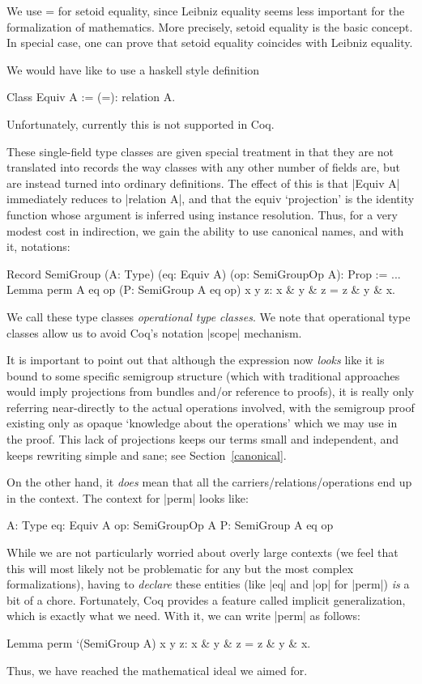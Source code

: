 \documentclass[a4paper,10pt, runningheads]{llncs}
\begin{document}
We use = for setoid equality, since Leibniz equality seems less important for the formalization of
mathematics. More precisely, setoid equality is the basic concept. In special case, one can prove
that setoid equality coincides with Leibniz equality.

We would have like to use a haskell style definition
\begin{code}
Class Equiv A := (=): relation A.
\end{code}
Unfortunately, currently this is not supported in Coq.

These single-field type classes are given special treatment in that they are not translated into
records the way classes with any other number of fields are, but are instead turned into ordinary
definitions. The effect of this is that |Equiv A| immediately reduces to |relation A|, and that the
equiv `projection' is the identity function whose argument is inferred using instance resolution.
Thus, for a very modest cost in indirection, we gain the ability to use canonical names, and with
it, notations:
\begin{code}
Record SemiGroup (A: Type) (eq: Equiv A)
                 (op: SemiGroupOp A): Prop := ...
Lemma perm A eq op (P: SemiGroup A eq op) x y z:
                 x & y & z = z & y & x.
\end{code}
We call these type classes \emph{operational type classes}. We note that operational type classes
allow us to avoid Coq's notation |scope| mechanism.

It is important to point out that although the expression now \emph{looks} like it is bound to some
specific semigroup structure (which with traditional approaches would imply projections from bundles
and/or reference to proofs), it is really only referring near-directly to the actual operations
involved, with the semigroup proof existing only as opaque `knowledge about the operations' which we
may use in the proof. This lack of projections keeps our terms small and independent, and keeps
rewriting simple and sane; see Section~\ref{canonical}.

On the other hand, it \emph{does} mean that all the carriers/relations/operations end up in the
context. The context for |perm| looks like:
\begin{code}
  A: Type
  eq: Equiv A
  op: SemiGroupOp A
  P: SemiGroup A eq op
\end{code}

While we are not particularly worried about overly large contexts (we feel that this will most
likely not be problematic for any but the most complex formalizations), having to \emph{declare}
these entities (like |eq| and |op| for |perm|) \emph{is} a bit of a chore. Fortunately, Coq
provides a feature called implicit generalization, which is exactly what we need.
With it, we can write |perm| as follows:
\begin{code}
  Lemma perm `(SemiGroup A) x y z: x & y & z = z & y & x.
\end{code}
Thus, we have reached the mathematical ideal we aimed for.
\end{document}
